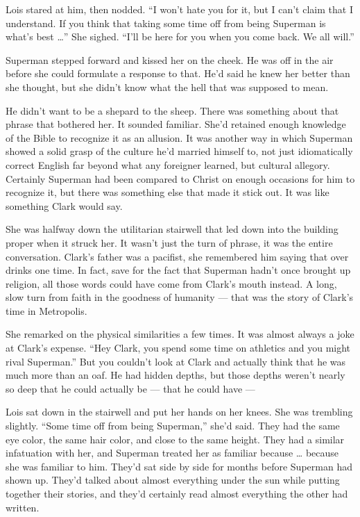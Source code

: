Lois stared at him, then nodded. ``I won't hate you for it, but I can't
claim that I understand. If you think that taking some time off from
being Superman is what's best \ldots{}'' She sighed. ``I'll be here for
you when you come back. We all will.''

Superman stepped forward and kissed her on the cheek. He was off in the
air before she could formulate a response to that. He'd said he knew her
better than she thought, but she didn't know what the hell that was
supposed to mean.

He didn't want to be a shepard to the sheep. There was something about
that phrase that bothered her. It sounded familiar. She'd retained
enough knowledge of the Bible to recognize it as an allusion. It was
another way in which Superman showed a solid grasp of the culture he'd
married himself to, not just idiomatically correct English far beyond
what any foreigner learned, but cultural allegory. Certainly Superman
had been compared to Christ on enough occasions for him to recognize it,
but there was something else that made it stick out. It was like
something Clark would say.

She was halfway down the utilitarian stairwell that led down into the
building proper when it struck her. It wasn't just the turn of phrase,
it was the entire conversation. Clark's father was a pacifist, she
remembered him saying that over drinks one time. In fact, save for the
fact that Superman hadn't once brought up religion, all those words
could have come from Clark's mouth instead. A long, slow turn from faith
in the goodness of humanity --- that was the story of Clark's time in
Metropolis.

She remarked on the physical similarities a few times. It was almost
always a joke at Clark's expense. ``Hey Clark, you spend some time on
athletics and you might rival Superman.'' But you couldn't look at Clark
and actually think that he was much more than an oaf. He had hidden
depths, but those depths weren't nearly so deep that he could actually
be --- that he could have ---

Lois sat down in the stairwell and put her hands on her knees. She was
trembling slightly. ``Some time off from being Superman,'' she'd said.
They had the same eye color, the same hair color, and close to the same
height. They had a similar infatuation with her, and Superman treated
her as familiar because \ldots{} because she was familiar to him. They'd
sat side by side for months before Superman had shown up. They'd talked
about almost everything under the sun while putting together their
stories, and they'd certainly read almost everything the other had
written.

